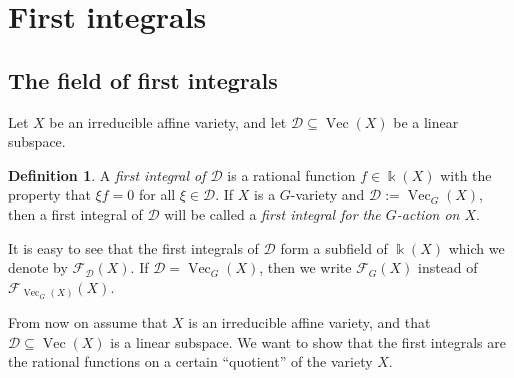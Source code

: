 \documentclass{amsart}
\theoremstyle{definition}
\newtheorem{defn}[thm]{Definition}
\theoremstyle{remark}
\begin{document}
{\par\medskip}
\section{First integrals}
\subsection{The field of first integrals}
Let $X$ be an irreducible affine variety, and let ${\mathcal D} {\subseteq} \operatorname{Vec}(X)$ be a linear subspace.
\begin{defn}
A {\it first integral of ${\mathcal D}$\/}  is a rational function $f \in {\Bbbk}(X)$ with the property that $\xi f = 0$ for all $\xi \in {\mathcal D}$. If $X$ is a $G$-variety and ${\mathcal D} := \operatorname{Vec}_{G}(X)$, then a first integral of ${\mathcal D}$ will be called a {\it first integral for the $G$-action on $X$}.
\end{defn}
It is easy to see that the first integrals of ${\mathcal D}$ form a subfield  of ${\Bbbk}(X)$ which we denote by ${\mathcal F}_{\mathcal D}(X)$. If ${\mathcal D} = \operatorname{Vec}_{G}(X)$, then we write ${\mathcal F}_{G}(X)$ instead of ${\mathcal F}_{\operatorname{Vec}_{G}(X)}(X)$.

{\par\smallskip}
From now on assume that $X$ is an irreducible affine variety, and that ${\mathcal D} {\subseteq} \operatorname{Vec}(X)$ is a linear subspace. 
We want to show that the first integrals are the rational functions on a certain ``quotient'' of the variety $X$.
\end{document}
